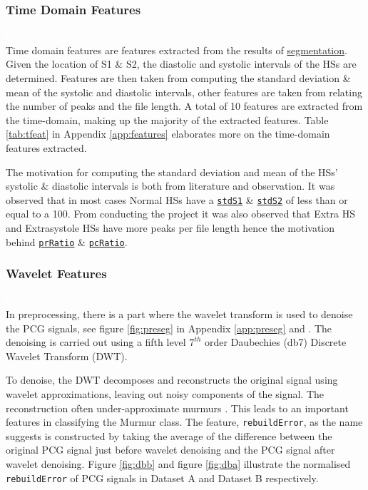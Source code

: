 \documentclass[10pt,twocolumn]{witseiepaper}
\begin{document}
\subsubsection{Time Domain Features}
\textcolor{white}{Ke na le modisa...}\\
Time domain features are features extracted from the results of \hyperref[sec:preseg]{segmentation}. Given the location of S1 \& S2, the diastolic and systolic intervals of the HSs are determined. Features are then taken from computing the standard deviation \& mean of the systolic and diastolic intervals, other features are taken from relating the number of peaks and the file length. A total of 10 features are extracted from the time-domain, making up the majority of the extracted features. Table \ref{tab:tfeat} in Appendix \ref{app:features} elaborates more on the time-domain features extracted.

The motivation for computing the standard deviation and mean of the HSs' systolic \& diastolic intervals is both from literature \cite{gomes2012classifying,bentley} and observation. It was observed that in most cases Normal HSs have a \hyperref[t:s1]{\texttt{stdS1}} \& \hyperref[t:s2]{\texttt{stdS2}} of less than or equal to a 100. From conducting the project it was also observed that Extra HS and Extrasystole HSs have more peaks per file length hence the motivation behind \hyperref[t:pr]{\texttt{prRatio}} \& \hyperref[t:pc]{\texttt{pcRatio}}.

\subsubsection{Wavelet Features}
\textcolor{white}{Ke tlabe ke hlokang...}\\
In preprocessing, there is a part where the wavelet transform is used to denoise the PCG signals, see figure \ref{fig:preseg} in Appendix \ref{app:preseg} and \cite{love}. The denoising is carried out using a fifth level $7^{th}$ order Daubechies (db7) Discrete Wavelet Transform (DWT). 

To denoise, the DWT decomposes and reconstructs the original signal using wavelet approximations, leaving out noisy components of the signal. The reconstruction often under-approximate murmurs \cite{10}. This leads to an important features in classifying the Murmur class. The feature, \texttt{rebuildError}, as the name suggests is constructed by taking the average of the difference between the original PCG signal just before wavelet denoising and the PCG signal after wavelet denoising. Figure \ref{fig:dbb} and figure \ref{fig:dba} illustrate the normalised \texttt{rebuildError} of PCG signals in Dataset A and Dataset B respectively.
\end{document}
